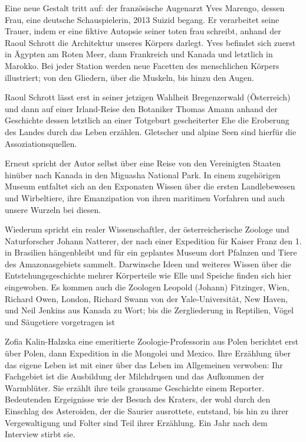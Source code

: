 Eine neue Gestalt tritt auf: der französische Augenarzt Yves Marengo, dessen
  Frau, eine deutsche Schauspielerin, 2013 Suizid begang.
Er verarbeitet seine Trauer, indem er eine fiktive Autopsie seiner toten frau
  schreibt, anhand der Raoul Schrott die Architektur unseres Körpers darlegt.
Yves befindet sich zuerst in Ägypten am Roten Meer, dann Frankreich und Kanada
  und letztlich in Marokko.
Bei jeder Station werden neue Facetten des menschlichen Körpers illustriert;
von den Gliedern, über die Muskeln, bis hinzu den Augen.

Raoul Schrott lässt erst in seiner jetzigen Wahlheit Bregenzerwald (Österreich)
  und dann auf einer Irland-Reise den Botaniker Thomas Amann anhand der
  Geschichte dessen letztlich an einer Totgeburt gescheiterter Ehe die
  Eroberung des Landes durch das Leben erzählen.
Gletscher und alpine Seen sind hierfür die Assoziationsquellen.

Erneut spricht der Autor selbst über eine Reise von den Vereinigten Staaten
  hinüber nach Kanada in den Miguasha National Park.
In einem zugehörigen Museum entfaltet sich an den Exponaten Wissen über die
  ersten Landlebewesen und Wirbeltiere, ihre Emanzipation von ihren maritimen
  Vorfahren und auch unsere Wurzeln bei diesen.

Wiederum spricht ein realer Wissenschaftler, der österreicherische Zoologe und
  Naturforscher Johann Natterer, der nach einer Expedition für Kaiser Franz
  den 1. in Brasilien hängenbleibt und für ein geplantes Museum dort Pfalnzen
  und Tiere des Amazonasgebiets sammelt.
Darwinsche Ideen und weiteres Wissen über die Entstehungsgeschichte mehrer
  Körperteile wie Elle und Speiche finden sich hier eingewoben.
Es kommen auch die Zoologen Leopold (Johann) Fitzinger, Wien, Richard
  Owen, London, Richard Swann von der Yale-Universität, New Haven, und Neil
  Jenkins aus Kanada zu Wort; bis die Zergliederung in Reptilien, Vögel und
  Säugetiere vorgetragen ist

Zofia Kalin-Halzska eine emeritierte Zoologie-Professorin aus Polen berichtet
  erst über Polen, dann Expedition in die Mongolei und Mexico.
Ihre Erzählung über das eigene Leben ist mit einer über das Leben im
  Allgemeinen verwoben: Ihr Fachgebiet ist \ua die Ausbildung der Milchdrųsen
  und das Aufkommen der Warmblüter.
Sie erzählt ihre teils grausame Geschichte einem Reporter.
Bedeutenden Ergeignisse wie der Besuch des Kraters, der wohl durch den Einschlag des
  Asteroiden, der die Saurier ausrottete, entstand, bis hin zu ihrer Vergewaltigung und
  Folter sind Teil ihrer Erzählung.
Ein Jahr nach dem Interview stirbt sie.

